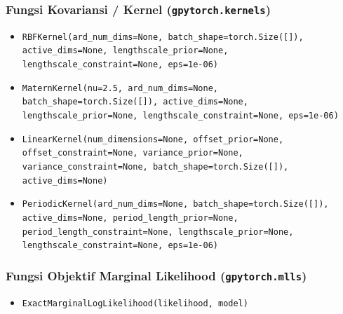\documentclass[11pt,a4paper]{article}
\begin{document}
\subsubsection{Fungsi Kovariansi / Kernel (\texttt{gpytorch.kernels})}
\begin{itemize}
    \item \texttt{RBFKernel(ard\_num\_dims=None, batch\_shape=torch.Size([]),} \\
    \texttt{active\_dims=None, lengthscale\_prior=None,} \\
    \texttt{lengthscale\_constraint=None, eps=1e-06)}
    
    \item \texttt{MaternKernel(nu=2.5, ard\_num\_dims=None,} \\
    \texttt{batch\_shape=torch.Size([]), active\_dims=None,} \\
    \texttt{lengthscale\_prior=None, lengthscale\_constraint=None, eps=1e-06)}
    
    \item \texttt{LinearKernel(num\_dimensions=None, offset\_prior=None,} \\
    \texttt{offset\_constraint=None, variance\_prior=None,} \\
    \texttt{variance\_constraint=None, batch\_shape=torch.Size([]),} \\
    \texttt{active\_dims=None)}
    
    \item \texttt{PeriodicKernel(ard\_num\_dims=None, batch\_shape=torch.Size([]),} \\
    \texttt{active\_dims=None, period\_length\_prior=None,} \\
    \texttt{period\_length\_constraint=None, lengthscale\_prior=None,} \\
    \texttt{lengthscale\_constraint=None, eps=1e-06)}
\end{itemize}

\subsubsection{Fungsi Objektif Marginal Likelihood (\texttt{gpytorch.mlls})}
\begin{itemize}
    \item \texttt{ExactMarginalLogLikelihood(likelihood, model)}
\end{itemize}
\end{document}
